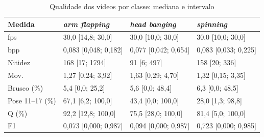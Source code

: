 \begin{table}[htbp]
\centering
\caption{Qualidade dos vídeos por classe: mediana e intervalo}
\label{tab:qualidade-classes}
\begin{tabular}{llll}
\toprule
Medida & \textit{arm flapping} & \textit{head banging} & \textit{spinning} \\
\midrule
fps & 30,0 [14,8; 30,0] & 30,0 [10,0; 30,0] & 30,0 [10,0; 30,0] \\
bpp & 0,083 [0,048; 0,182] & 0,077 [0,042; 0,654] & 0,083 [0,033; 0,225] \\
Nitidez & 168 [17; 1794] & 91 [6; 497] & 158 [20; 336] \\
Mov. & 1,27 [0,24; 3,92] & 1,63 [0,29; 4,70] & 1,32 [0,15; 3,35] \\
Brusco (\%) & 5,4 [0,0; 25,2] & 5,6 [0,0; 48,4] & 6,3 [0,0; 48,5] \\
Pose 11--17 (\%) & 67,1 [6,2; 100,0] & 43,4 [0,0; 100,0] & 28,0 [1,3; 98,8] \\
Q (\%) & 92,2 [12,8; 100,0] & 75,5 [28,0; 100,0] & 81,4 [5,0; 100,0] \\
F1 & 0,073 [0,000; 0,987] & 0,094 [0,000; 0,987] & 0,723 [0,000; 0,985] \\
\bottomrule
\end{tabular}
\end{table}
